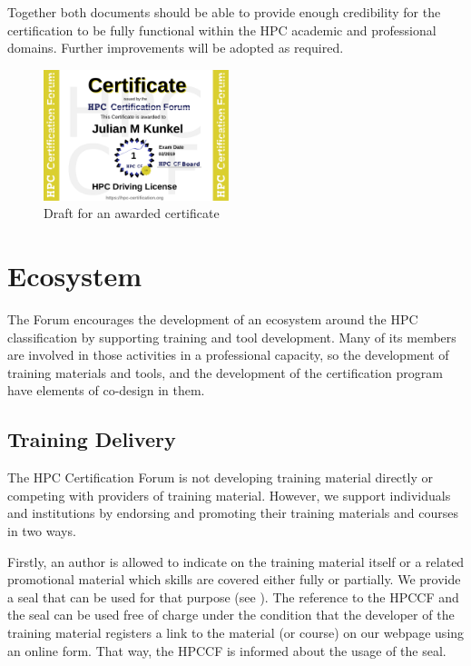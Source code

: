 \documentclass[jocse]{jocseart}
\begin{document}
Together both documents should be able to provide enough credibility for the certification to be fully functional within the HPC academic and professional domains. Further improvements will be adopted as required.

\begin{figure}
  \includegraphics[width=0.48\textwidth]{JulianMKunkel}
  \caption{Draft for an awarded certificate}
  \label{fig:awardedCertificate}
\end{figure}

\section{Ecosystem}
\label{sec:ecosystem}

The Forum encourages the development of an ecosystem around the HPC classification by supporting training and tool development. Many of its members are involved in those activities in a professional capacity, so the development of training materials and tools, and the development of the certification program have elements of co-design in them.

\subsection{Training Delivery}

The HPC Certification Forum is not developing training material directly or competing with providers of training material.
However, we support individuals and institutions by endorsing and promoting their training materials and courses in two ways.

Firstly, an author is allowed to indicate on the training material itself or a related promotional material which skills are covered either fully or partially.
We provide a seal that can be used for that purpose (see ).
The reference to the HPCCF and the seal can be used free of charge under the condition that the developer of the training material registers a link to the material (or course) on our webpage using an online form. %
That way, the HPCCF is informed about the usage of the seal.
\end{document}
